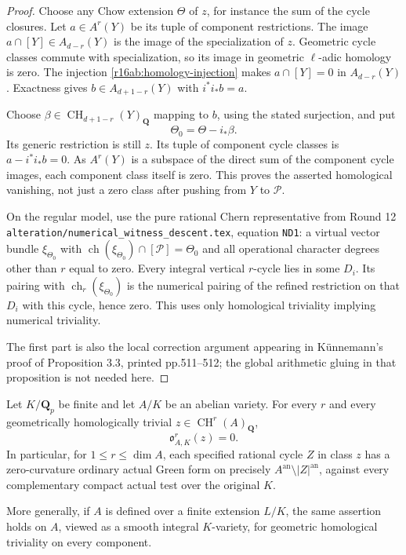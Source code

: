 \begin{proof}
Choose any Chow extension $\Theta$ of $z$, for instance the sum of
the cycle closures.  Let $a\in A^r(Y)$ be its tuple of component
restrictions.  The image $a\cap[Y]\in A_{d-r}(Y)$ is the image of
the specialization of $z$.  Geometric cycle classes commute with
specialization, so its image in geometric $\ell$-adic homology is zero.
The injection \eqref{r16ab:homology-injection} makes
$a\cap[Y]=0$ in $A_{d-r}(Y)$.  Exactness gives
$b\in A_{d+1-r}(Y)$ with $i^*i_*b=a$.

Choose $\beta\in\operatorname{CH}_{d+1-r}(Y)_{\mathbf Q}$ mapping
to $b$, using the stated surjection, and put
\[
                       \Theta_0=\Theta-i_*\beta.
 \tag{AB16.5}\label{r16ab:corrected-witness}
\]
Its generic restriction is still $z$.  Its tuple of component
cycle classes is $a-i^*i_*b=0$.  As $A^r(Y)$ is a subspace of
the direct sum of the component cycle images, each component class
itself is zero.  This proves the asserted homological vanishing,
not just a zero class after pushing from $Y$ to $\mathcal P$.

On the regular model, use the pure rational Chern representative
from Round 12 \texttt{alteration/numerical\_witness\_descent.tex},
equation \texttt{ND1}: a virtual vector bundle $\xi_{\Theta_0}$
with $\operatorname{ch}(\xi_{\Theta_0})\cap[\mathcal P]=\Theta_0$
and all operational character degrees other than $r$ equal to zero.
Every integral vertical $r$-cycle lies in some $D_i$.  Its pairing
with $\operatorname{ch}_r(\xi_{\Theta_0})$ is the numerical pairing
of the refined restriction on that $D_i$ with this cycle, hence zero.
This uses only homological triviality implying numerical triviality.

The first part is also the local correction argument appearing in
K\"unnemann's proof of Proposition 3.3, printed pp.511--512; the
global arithmetic gluing in that proposition is not needed here.
\end{proof}

\begin{theorem}
\label{r16ab:local-G}
Let $K/\mathbf Q_p$ be finite and let $A/K$ be an abelian variety.
For every $r$ and every geometrically homologically trivial
$z\in\operatorname{CH}^r(A)_{\mathbf Q}$,
\[
                         \mathfrak o_{A,K}^r(z)=0.
 \tag{AB16.6}\label{r16ab:abelian-obstruction-zero}
\]
In particular, for $1\le r\le\dim A$, each specified rational
cycle $Z$ in class $z$ has a zero-curvature ordinary actual Green
form on precisely $A^{\mathrm{an}}\setminus|Z|^{\mathrm{an}}$,
against every complementary compact actual test over the original $K$.

More generally, if $A$ is defined over a finite extension $L/K$,
the same assertion holds on $A$, viewed as a smooth integral
$K$-variety, for geometric homological triviality on every component.
\end{theorem}

